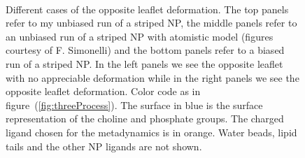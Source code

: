 \begin{figure}[ht!]
{		}\ %
		\caption{Different cases of the opposite leaflet deformation. The top panels refer to my unbiased run of a striped \ac{NP}, the middle panels refer to an unbiased run of a striped \ac{NP} with atomistic model (figures courtesy of F. Simonelli) and the bottom panels refer to a biased run of a striped \ac{NP}. In the left panels we see the opposite leaflet with no appreciable deformation while in the right panels we see the opposite leaflet deformation. Color code as in figure~(\ref{fig:threeProcess}). The surface in blue is the surface representation of the choline and phosphate groups. The charged ligand chosen for the metadynamics is in orange. Water beads, lipid tails and the other \acs{NP} ligands are not shown.}%
		\label{fig:engulfmentFrame}
\end{figure}


